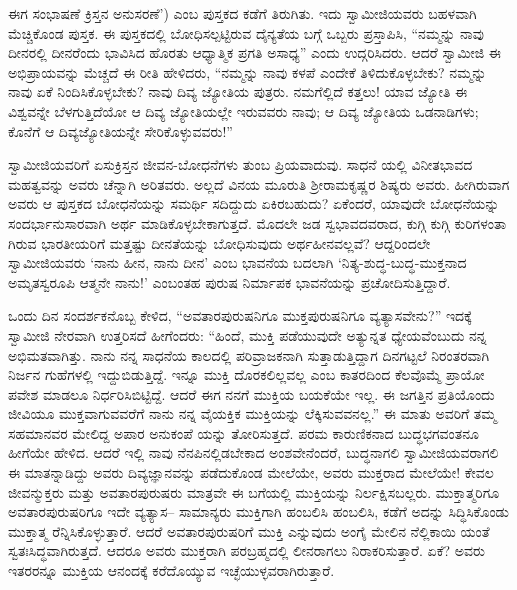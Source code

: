 ಈಗ ಸಂಭಾಷಣೆ ಕ್ರಿಸ್ತನ ಅನುಸರಣೆ’) ಎಂಬ ಪುಸ್ತಕದ ಕಡೆಗೆ ತಿರುಗಿತು. ಇದು ಸ್ವಾಮೀಜಿಯವರು ಬಹಳವಾಗಿ ಮೆಚ್ಚಿಕೊಂಡ ಪುಸ್ತಕ. ಈ ಪುಸ್ತಕದಲ್ಲಿ ಬೋಧಿಸಲ್ಪಟ್ಟಿರುವ ದೈನ್ಯತೆಯ ಬಗ್ಗೆ ಒಬ್ಬರು ಪ್ರಸ್ತಾಪಿಸಿ, “ನಮ್ಮನ್ನು ನಾವು ದೀನರಲ್ಲಿ ದೀನರೆಂದು ಭಾವಿಸಿದ ಹೊರತು ಆಧ್ಯಾತ್ಮಿಕ ಪ್ರಗತಿ ಅಸಾಧ್ಯ” ಎಂದು ಉದ್ಗರಿಸಿದರು. ಆದರೆ ಸ್ವಾಮೀಜಿ ಈ ಅಭಿಪ್ರಾಯವನ್ನು ಮೆಚ್ಚದೆ ಈ ರೀತಿ ಹೇಳಿದರು, “ನಮ್ಮನ್ನು ನಾವು ಕಳಪೆ ಎಂದೇಕೆ ತಿಳಿದುಕೊಳ್ಳಬೇಕು? ನಮ್ಮನ್ನು ನಾವು ಏಕೆ ನಿಂದಿಸಿಕೊಳ್ಳಬೇಕು? ನಾವು ದಿವ್ಯ ಜ್ಯೋತಿಯ ಪುತ್ರರು. ನಮಗೆಲ್ಲಿದೆ ಕತ್ತಲು! ಯಾವ ಜ್ಯೋತಿ ಈ ವಿಶ್ವವನ್ನೇ ಬೆಳಗುತ್ತಿದೆಯೋ ಆ ದಿವ್ಯ ಜ್ಯೋತಿಯಲ್ಲೇ ಇರುವವರು ನಾವು; ಆ ದಿವ್ಯ ಜ್ಯೋತಿಯ ಒಡನಾಡಿಗಳು; ಕೊನೆಗೆ ಆ ದಿವ್ಯಜ್ಯೋತಿಯನ್ನೇ ಸೇರಿಕೊಳ್ಳುವವರು!”

ಸ್ವಾಮೀಜಿಯವರಿಗೆ ಏಸುಕ್ರಿಸ್ತನ ಜೀವನ-ಬೋಧನೆಗಳು ತುಂಬ ಪ್ರಿಯವಾದುವು. ಸಾಧನೆ ಯಲ್ಲಿ ವಿನೀತಭಾವದ ಮಹತ್ವವನ್ನು ಅವರು ಚೆನ್ನಾಗಿ ಅರಿತವರು. ಅಲ್ಲದೆ ವಿನಯ ಮೂರುತಿ ಶ್ರೀರಾಮಕೃಷ್ಣರ ಶಿಷ್ಯರು ಅವರು. ಹೀಗಿರುವಾಗ ಅವರು ಆ ಪುಸ್ತಕದ ಬೋಧನೆಯನ್ನು ಸಮರ್ಥಿ ಸದಿದ್ದುದು ಏಕಿರಬಹುದು? ಏಕೆಂದರೆ, ಯಾವುದೇ ಬೋಧನೆಯನ್ನು ಸಂದರ್ಭಾನುಸಾರವಾಗಿ ಅರ್ಥ ಮಾಡಿಕೊಳ್ಳಬೇಕಾಗುತ್ತದೆ. ಮೊದಲೇ ಜಡ ಸ್ವಭಾವದವರಾದ, ಕುಗ್ಗಿ ಕುಗ್ಗಿ ಕುರಿಗಳಂತಾ ಗಿರುವ ಭಾರತೀಯರಿಗೆ ಮತ್ತಷ್ಟು ದೀನತೆಯನ್ನು ಬೋಧಿಸುವುದು ಅರ್ಥಹೀನವಲ್ಲವೆ? ಆದ್ದರಿಂದಲೇ ಸ್ವಾಮೀಜಿಯವರು ‘ನಾನು ಹೀನ, ನಾನು ದೀನ’ ಎಂಬ ಭಾವನೆಯ ಬದಲಾಗಿ ‘ನಿತ್ಯ-ಶುದ್ಧ-ಬುದ್ಧ-ಮುಕ್ತನಾದ ಅಮೃತಸ್ವರೂಪಿ ಆತ್ಮನೇ ನಾನು!’ ಎಂಬಂತಹ ಪುರುಷ ನಿರ್ಮಾಪಕ ಭಾವನೆಯನ್ನು ಪ್ರಚೋದಿಸುತ್ತಿದ್ದಾರೆ.

ಒಂದು ದಿನ ಸಂದರ್ಶಕನೊಬ್ಬ ಕೇಳಿದ, “ಅವತಾರಪುರುಷನಿಗೂ ಮುಕ್ತಪುರುಷನಿಗೂ ವ್ಯತ್ಯಾಸವೇನು?” ಇದಕ್ಕೆ ಸ್ವಾಮೀಜಿ ನೇರವಾಗಿ ಉತ್ತರಿಸದೆ ಹೀಗೆಂದರು: “ಹಿಂದೆ, ಮುಕ್ತಿ ಪಡೆಯುವುದೇ ಅತ್ಯುನ್ನತ ಧ್ಯೇಯವೆಂಬುದು ನನ್ನ ಅಭಿಮತವಾಗಿತ್ತು. ನಾನು ನನ್ನ ಸಾಧನೆಯ ಕಾಲದಲ್ಲಿ ಪರಿವ್ರಾಜಕನಾಗಿ ಸುತ್ತಾಡುತ್ತಿದ್ದಾಗ ದಿನಗಟ್ಟಲೆ ನಿರಂತರವಾಗಿ ನಿರ್ಜನ ಗುಹೆಗಳಲ್ಲಿ ಇದ್ದುಬಿಡುತ್ತಿದ್ದೆ. ಇನ್ನೂ ಮುಕ್ತಿ ದೊರಕಲಿಲ್ಲವಲ್ಲ ಎಂಬ ಕಾತರದಿಂದ ಕೆಲವೊಮ್ಮೆ ಪ್ರಾಯೋ ಪವೇಶ ಮಾಡಲೂ ನಿರ್ಧರಿಸಿಬಿಟ್ಟಿದ್ದೆ. ಆದರೆ ಈಗ ನನಗೆ ಮುಕ್ತಿಯ ಬಯಕೆಯೇ ಇಲ್ಲ. ಈ ಜಗತ್ತಿನ ಪ್ರತಿಯೊಂದು ಜೀವಿಯೂ ಮುಕ್ತವಾಗುವವರೆಗೆ ನಾನು ನನ್ನ ವೈಯಕ್ತಿಕ ಮುಕ್ತಿಯನ್ನು ಲೆಕ್ಕಿಸುವವನಲ್ಲ.” ಈ ಮಾತು ಅವರಿಗೆ ತಮ್ಮ ಸಹಮಾನವರ ಮೇಲಿದ್ದ ಅಪಾರ ಅನುಕಂಪೆ ಯನ್ನು ತೋರಿಸುತ್ತದೆ. ಪರಮ ಕಾರುಣಿಕನಾದ ಬುದ್ಧಭಗವಂತನೂ ಹೀಗೆಯೇ ಹೇಳಿದ. ಆದರೆ ಇಲ್ಲಿ ನಾವು ನೆನಪಿನಲ್ಲಿಡಬೇಕಾದ ಅಂಶವೇನೆಂದರೆ, ಬುದ್ಧನಾಗಲಿ ಸ್ವಾಮೀಜಿಯವರಾಗಲಿ ಈ ಮಾತನ್ನಾಡಿದ್ದು ಅವರು ದಿವ್ಯಜ್ಞಾನವನ್ನು ಪಡೆದುಕೊಂಡ ಮೇಲೆಯೇ, ಅವರು ಮುಕ್ತರಾದ ಮೇಲೆಯೇ! ಕೇವಲ ಜೀವನ್ಮುಕ್ತರು ಮತ್ತು ಅವತಾರಪುರುಷರು ಮಾತ್ರವೇ ಈ ಬಗೆಯಲ್ಲಿ ಮುಕ್ತಿಯನ್ನು ನಿರ್ಲಕ್ಷಿಸಬಲ್ಲರು. ಮುಕ್ತಾತ್ಮರಿಗೂ ಅವತಾರಪುರುಷರಿಗೂ ಇದೇ ವ್ಯತ್ಯಾಸ– ಸಾಮಾನ್ಯರು ಮುಕ್ತಿಗಾಗಿ ಹಂಬಲಿಸಿ ಹಂಬಲಿಸಿ, ಕಡೆಗೆ ಅದನ್ನು ಸಿದ್ಧಿಸಿಕೊಂಡು ಮುಕ್ತಾತ್ಮ ರೆನ್ನಿಸಿಕೊಳ್ಳುತ್ತಾರೆ. ಆದರೆ ಅವತಾರಪುರುಷರಿಗೆ ಮುಕ್ತಿ ಎನ್ನುವುದು ಅಂಗೈ ಮೇಲಿನ ನೆಲ್ಲಿಕಾಯಿ ಯಂತೆ ಸ್ವತಃಸಿದ್ಧವಾಗಿರುತ್ತದೆ. ಆದರೂ ಅವರು ಮುಕ್ತರಾಗಿ ಪರಬ್ರಹ್ಮದಲ್ಲಿ ಲೀನರಾಗಲು ನಿರಾಕರಿಸುತ್ತಾರೆ. ಏಕೆ? ಅವರು ಇತರರನ್ನೂ ಮುಕ್ತಿಯ ಆನಂದಕ್ಕೆ ಕರೆದೊಯ್ಯುವ ಇಚ್ಛೆಯುಳ್ಳವರಾಗಿರುತ್ತಾರೆ.

